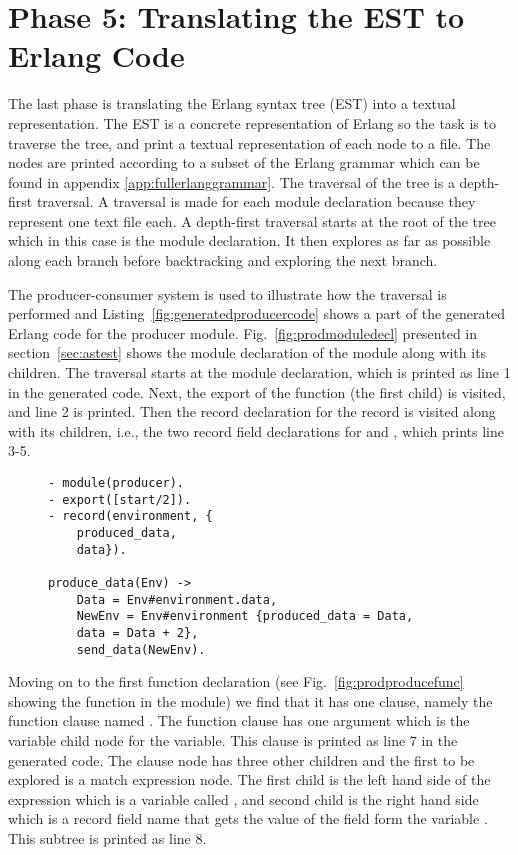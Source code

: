 \section{Phase 5: Translating the EST to Erlang Code}
\label{sec:esttocode}

The last phase is translating the Erlang syntax tree (EST) into a textual representation. The EST is a concrete representation of Erlang so the task is to traverse the tree, and print a textual representation of each node to a file. The nodes are printed according to a subset of the Erlang grammar \cite{RefWorks:91} which can be found in appendix \ref{app:fullerlanggrammar}. The traversal of the tree is a depth-first traversal. A traversal is made for each module declaration because they represent one text file each. A depth-first traversal starts at the root of the tree which in this case is the module declaration. It then explores as far as possible along each branch before backtracking and exploring the next branch.

The producer-consumer system is used to illustrate how the traversal is performed and Listing~\ref{fig:generatedproducercode} shows a part of the generated Erlang code for the producer module. Fig.~\ref{fig:prodmoduledecl} presented in section~\ref{sec:astest} shows the module declaration of the  module along with its children. The traversal starts at the module declaration, which is printed as line 1 in the generated code. Next, the export of the function  (the first child) is visited, and line 2 is printed. Then the record declaration for the  record is visited along with its children, i.e., the two record field declarations for  and , which prints line 3-5.

\begin{figure}
\begin{verbatim}
- module(producer).
- export([start/2]).
- record(environment, {
 	produced_data,
 	data}).

produce_data(Env) -> 
 	Data = Env#environment.data,
 	NewEnv = Env#environment {produced_data = Data,
 	data = Data + 2},
 	send_data(NewEnv).
\end{verbatim}
\end{figure}

Moving on to the first function declaration (see Fig.~\ref{fig:prodproducefunc} showing the function  in the  module) we find that it has one clause, namely the function clause named . The function clause has one argument which is the variable child node for the  variable. This clause is printed as line 7 in the generated code. The clause node has three other children and the first to be explored is a match expression node. The first child is the left hand side of the expression which is a variable called , and second child is the right hand side which is a record field name that gets the value of the field  form the variable . This subtree is printed as line 8.


